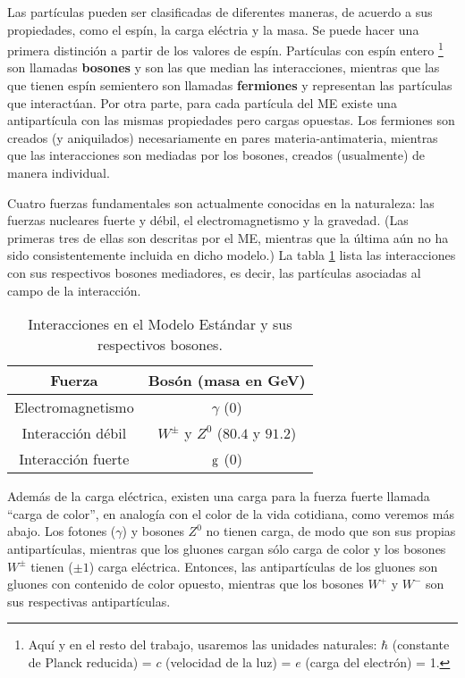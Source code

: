 \documentclass[a4paper,12pt]{article}
\begin{document}
Las partículas pueden ser clasificadas de diferentes maneras, de acuerdo a sus propiedades, como el espín, la carga eléctria y la masa. Se puede hacer una primera distinción a partir de los valores de espín. Partículas con espín entero \footnote{Aquí y en el resto del trabajo, usaremos las unidades naturales: $\hbar$ (constante de Planck reducida) = $c$ (velocidad de la luz) = $e$ (carga del electrón) = 1.} son llamadas \textbf{bosones} y son las que median las interacciones, mientras que las que tienen espín semientero son llamadas \textbf{fermiones} y representan las partículas que interactúan. Por otra parte, para cada partícula del ME existe una antipartícula con las mismas propiedades pero cargas opuestas. Los fermiones son creados (y aniquilados) necesariamente en pares materia-antimateria, mientras que las interacciones son mediadas por los bosones, creados (usualmente) de manera individual.

Cuatro fuerzas fundamentales son actualmente conocidas en la naturaleza: las fuerzas nucleares fuerte y débil, el electromagnetismo y la gravedad. (Las primeras tres de ellas son descritas por el ME, mientras que la última aún no ha sido consistentemente incluida en dicho modelo.) La tabla \ref{table:SMBoson} lista las interacciones con sus respectivos bosones mediadores, es decir, las partículas asociadas al campo de la interacción.

\begin{table}[!h]
\caption{Interacciones en el Modelo Estándar y sus respectivos bosones.}\smallskip
\label{table:SMBoson}
\centering 

\begin{tabular}{cc}
\hline \hline  
\smallskip
Fuerza& Bosón (masa en GeV\cite{Beringer:1900zz}) \\ 
\hline
Electromagnetismo & $\gamma$ (0) \\
Interacción débil & $W^\pm$ y $Z^0$ ($80.4$ y $91.2$) \\
Interacción fuerte & ${\mathrm g}$ (0) \\
\end{tabular}
\end{table}


Además de la carga eléctrica, existen una carga para la fuerza fuerte llamada ``carga de color'', en analogía con el color de la vida cotidiana, como veremos más abajo. Los fotones ($\gamma$) y bosones $Z^0$ no tienen carga, de modo que son sus propias antipartículas, mientras que los gluones cargan sólo carga de color y los bosones $W^\pm$ tienen ($\pm 1$) carga eléctrica. Entonces, las antipartículas de los gluones son gluones con contenido de color opuesto, mientras que los bosones $W^+$ y $W^-$ son sus respectivas antipartículas.
\end{document}
